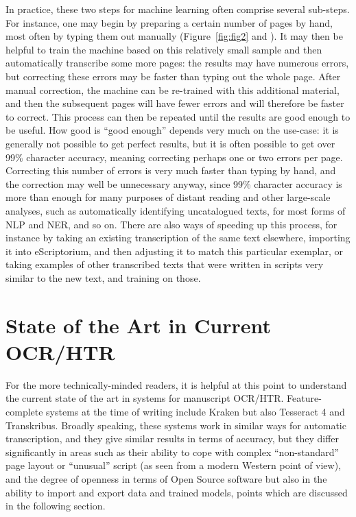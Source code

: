 In practice, these two steps for machine learning often comprise several
sub-steps. For instance, one may begin by preparing a certain number of pages
by hand, most often by typing them out manually (Figure~\ref{fig:fig2} and
\cite[n. 4]{stokes2020videos}). It may then be helpful to train the machine
based on this relatively small sample and then automatically transcribe some
more pages: the results may have numerous errors, but correcting these errors
may be faster than typing out the whole page. After manual correction, the
machine can be re-trained with this additional material, and then the
subsequent pages will have fewer errors and will therefore be faster to
correct. This process can then be repeated until the results are good enough to
be useful. How good is “good enough” depends very much on the use-case: it is
generally not possible to get perfect results, but it is often possible to get
over 99\% character accuracy, meaning correcting perhaps one or two errors per
page. Correcting this number of errors is very much faster than typing by hand,
and the correction may well be unnecessary anyway, since 99\% character
accuracy is more than enough for many purposes of distant reading and other
large-scale analyses, such as automatically identifying uncatalogued texts, for
most forms of NLP and NER, and so on. There are also ways of speeding up this
process, for instance by taking an existing transcription of the same text
elsewhere, importing it into eScriptorium, and then adjusting it to match this
particular exemplar, or taking examples of other transcribed texts that were
written in scripts very similar to the new text, and training on those.

\section{State of the Art in Current OCR/HTR}

For the more technically-minded readers, it is helpful at this point to
understand the current state of the art in systems for manuscript OCR/HTR.
Feature-complete systems at the time of writing include Kraken but also
Tesseract 4 and Transkribus. Broadly speaking, these systems work in similar
ways for automatic transcription, and they give similar results in terms of
accuracy, but they differ significantly in areas such as their ability to cope
with complex “non-standard” page layout or “unusual” script (as seen from a
modern Western point of view), and the degree of openness in terms of Open
Source software but also in the ability to import and export data and trained
models, points which are discussed in the following section.

